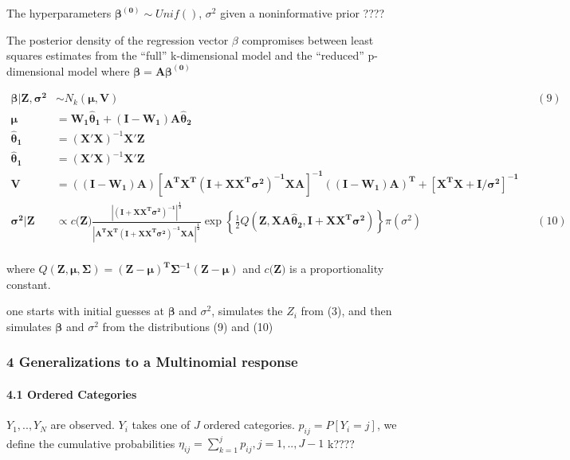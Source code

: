 \documentclass[
]{article}
\begin{document}
The hyperparameters \(\boldsymbol{\beta^{(0)}}\sim Unif()\),
\(\sigma^2\) given a noninformative prior {????}

The posterior density of the regression vector \(\beta\) compromises
between least squares estimates from the ``full'' k-dimensional model
and the ``reduced'' p-dimensional model where
\(\boldsymbol{\beta=A\beta^{(0)}}\)

\[
\begin{align} 
\boldsymbol{\beta|Z,\sigma^2}&\sim N_k(\boldsymbol{\mu,V}) &&(9)\\ 
\boldsymbol{\mu}&=\boldsymbol{W_1\hat\theta_1+(I-W_1)A\hat\theta_2} \\
\boldsymbol{\hat\theta_1}&=(\mathbf{X'X})^{-1}\mathbf{X'Z} \\
\boldsymbol{\hat\theta_1}&=(\mathbf{X'X})^{-1}\mathbf{X'Z} \\
\boldsymbol{V}&=\boldsymbol{((I-W_1)A)[A^TX^T(I+XX^T\sigma^2)^{-1}XA]^{-1}((I-W_1)A)^T+[X^TX+I/\sigma^2]^{-1}} \\
\boldsymbol{\sigma^2|Z}&\propto c(\mathbf{Z)\frac{|(I+XX^T\sigma^2)^{-1}|^{\frac12}}{|A^TX^T(I+XX^T\sigma^2)^{-1}XA|^{\frac12}}}\exp{\left\{\frac12Q(\boldsymbol{Z,XA\hat\theta_2,I+XX^T\sigma^2})\right\}}\pi(\sigma^2) &&(10)\\ 
\end{align}
\]

where
\(Q(\boldsymbol{Z,\mu,\Sigma})=\boldsymbol{(Z-\mu)^T\Sigma^{-1}(Z-\mu)}\)
and \(c(\mathbf{Z)}\) is a proportionality constant.

one starts with initial guesses at \(\boldsymbol{\beta}\) and
\(\sigma^2\), simulates the \(Z_i\) from (3), and then simulates
\(\boldsymbol{\beta}\) and \(\sigma^2\) from the distributions (9) and
(10)

\hypertarget{generalizations-to-a-multinomial-response}{%
\subsubsection{4 Generalizations to a Multinomial
response}\label{generalizations-to-a-multinomial-response}}

\hypertarget{ordered-categories}{%
\paragraph{4.1 Ordered Categories}\label{ordered-categories}}

\(Y_1,..,Y_N\) are observed. \(Y_i\) takes one of \(J\) ordered
categories. \(p_{ij}=P[Y_i=j]\), we define the cumulative probabilities
\(\eta_{ij}=\sum_{k=1}^jp_{ij},j=1,..,J-1\) {k????}
\end{document}
